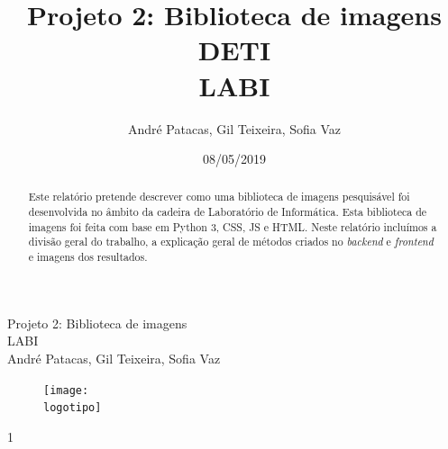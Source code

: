 \documentclass{report}
\begin{document}
%
\def\titulo{Projeto 2: Biblioteca de imagens}
\def\data{08/05/2019}
\def\autores{André Patacas, Gil Teixeira, Sofia Vaz}
\def\autorescontactos{(93357) andrepatacas@ua.pt, (88194) gilteixeira@ua.pt, (92968) sofiateixeiravaz@ua.pt}
\def\versao{1}
\def\departamento{DETI}
\def\empresa{LABI}
\def\logotipo{ua.pdf}

%
%
\begin{titlepage}

\begin{center}
\centering
%
\vspace*{50mm}
%
{\Huge \titulo}\\ 
%
\vspace{10mm}
%
{\Large \empresa}\\
%
\vspace{10mm}
%
{\large \autores}\\ 
%
\vspace{30mm}
%
\begin{figure}[h]
\centering
\texttt{[image: \\logotipo]}
\end{figure}
%
\vspace{30mm}
\end{center}
%
\begin{flushright}
\versao
\end{flushright}
\end{titlepage}

\title{%
{\Huge\textbf{\titulo}}\\
{\Large \departamento\\ \empresa}
}
%
\author{%
    \autores 
}
%
\date{\data}
%
\maketitle



\begin{abstract}
Este relatório pretende descrever como uma biblioteca de imagens pesquisável foi desenvolvida no âmbito da cadeira de Laboratório de Informática. Esta biblioteca de imagens foi feita com base em Python 3, \ac{CSS}, \ac{JS} e \ac{HTML}. Neste relatório incluímos a divisão geral do trabalho, a explicação geral de métodos criados no \textit{backend} e \textit{frontend} e imagens dos resultados. 
\end{abstract}

\end{document}
